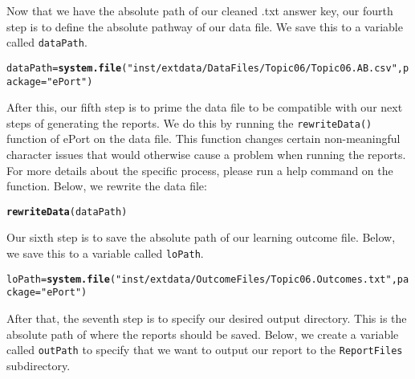 \documentclass{article}\usepackage[]{graphicx}\usepackage[]{color}
\makeatletter
\newcommand{\hlstr}[1]{\textcolor[rgb]{0.192,0.494,0.8}{#1}}%
\newcommand{\hlstd}[1]{\textcolor[rgb]{0.345,0.345,0.345}{#1}}%
\newcommand{\hlkwb}[1]{\textcolor[rgb]{0.69,0.353,0.396}{#1}}%
\newcommand{\hlkwc}[1]{\textcolor[rgb]{0.333,0.667,0.333}{#1}}%
\newcommand{\hlkwd}[1]{\textcolor[rgb]{0.737,0.353,0.396}{\textbf{#1}}}%
\newenvironment{kframe}{%
 \def\at@end@of@kframe{}%
 \ifinner\ifhmode%
  \def\at@end@of@kframe{\end{minipage}}%
  \begin{minipage}{\columnwidth}%
 \fi\fi%
 \def\FrameCommand##1{\hskip\@totalleftmargin \hskip-\fboxsep
 \colorbox{shadecolor}{##1}\hskip-\fboxsep
     \hskip-\linewidth \hskip-\@totalleftmargin \hskip\columnwidth}%
 \MakeFramed {\advance\hsize-\width
   \@totalleftmargin\z@ \linewidth\hsize
   \@setminipage}}%
 {\par\unskip\endMakeFramed%
 \at@end@of@kframe}
\newenvironment{knitrout}{}{} %
\numberwithin{equation}{section} %
\makeatother
\begin{document}
Now that we have the absolute path of our cleaned .txt answer key, our fourth step is to define the absolute pathway of our data file. We save this to a variable called \texttt{dataPath}.

\begin{knitrout}
\color{fgcolor}\begin{kframe}
\begin{alltt}
\hlstd{dataPath} \hlkwb{=} \hlkwd{system.file}\hlstd{(}\hlstr{"inst/extdata/DataFiles/Topic06/Topic06.AB.csv"}\hlstd{,} \hlkwc{package}\hlstd{=}\hlstr{"ePort"}\hlstd{)}
\end{alltt}
\end{kframe}
\end{knitrout}

After this, our fifth step is to prime the data file to be compatible with our next steps of generating the reports. We do this by running the \texttt{rewriteData()} function of ePort on the data file. This function changes certain non-meaningful character issues that would otherwise cause a problem when running the reports. For more details about the specific process, please run a help command on the function. Below, we rewrite the data file:

\begin{knitrout}
\color{fgcolor}\begin{kframe}
\begin{alltt}
\hlkwd{rewriteData}\hlstd{(dataPath)}
\end{alltt}
\end{kframe}
\end{knitrout}

Our sixth step is to save the absolute path of our learning outcome file. Below, we save this to a variable called \texttt{loPath}.

\begin{knitrout}
\color{fgcolor}\begin{kframe}
\begin{alltt}
\hlstd{loPath} \hlkwb{=} \hlkwd{system.file}\hlstd{(}\hlstr{"inst/extdata/OutcomeFiles/Topic06.Outcomes.txt"}\hlstd{,} \hlkwc{package}\hlstd{=}\hlstr{"ePort"}\hlstd{)}
\end{alltt}
\end{kframe}
\end{knitrout}

After that, the seventh step is to specify our desired output directory. This is the absolute path of where the reports should be saved. Below, we create a variable called \texttt{outPath} to specify that we want to output our report to the \texttt{ReportFiles} subdirectory.
\end{document}
